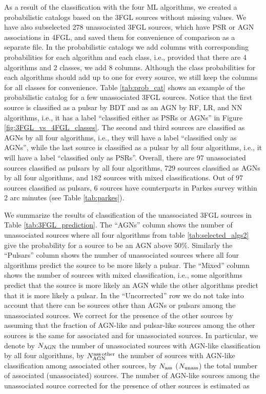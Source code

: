 As a result of the classification with the four ML algorithms,
we created a probabilistic catalogs based on the 3FGL sources without missing values.
We have also subselected 278 unassociated 3FGL sources, which have PSR or AGN associations in 4FGL,
and saved them for convenience of comparison as a separate file.
In the probabilistic catalogs we add columns with corresponding probabilities for each algorithm and each class,
i.e., provided that there are 4 algorithms and 2 classes, we add 8 columns.
Although the class probabilities for each algorithms should add up to one for every source, we still keep the columns for all classes for convenience.
Table \ref{tab:prob_cat} shows an example of the probabilistic catalog for a few unassociated 3FGL sources.
Notice that the first source is classified as a pulsar by BDT and as an AGN by RF, LR, and NN algorithms,
i.e., it has a label ``classified either as PSRs or AGNs'' in Figure \ref{fig:3FGL_vs_4FGL_classes}.
The second and third sources are classified as AGNs by all four algorithms, i.e., they will have a label
``classified only as AGNs'',
while the last source is classified as a pulsar by all four algorithms, i.e., it will have a label
``classified only as PSRs''.
Overall, there are 97 unassociated sources classified as pulsars by all four algorithms, 729 sources classified as AGNs by all four algorithms, and 182 sources with mixed classifications.
Out of 97 sources classified as pulsars, 6 sources have counterparts in Parkes survey \cite{Camilo2015} within 2 arc minutes (see Table \ref{tab:parkes}).

We summarize the results of classification of the unassociated 3FGL sources in Table \ref{tab:3FGL_prediction}.
The ``AGNs'' column shows the number of unassociated sources where all four algorithms from table \ref{tab:selected_algs2} give the probability for a source to be an AGN above 50\%.
Similarly the ``Pulsars'' column shows the number of unassociated sources where all four algorithms predict the source to be more likely a pulsar.
The ``Mixed'' column shows the number of sources with mixed classification, i.e., some algorithms predict that the source is more likely an AGN while the other algorithms predict that it is more likely a pulsar.
In the ``Uncorrected'' row we do not take into account that there can be sources other than AGNs or pulsars among the unassociated sources.
We correct for the presence of the other sources by assuming that the fraction of AGN-like and pulsar-like sources among the other sources is the same for associated and for unassociated sources.
In particular, we denote by $N_{\rm AGN}$ the number of unassociated sources with AGN-like classification by all four algorithms,
by $N_{\rm AGN}^{\rm ass\,other}$ the number of sources with AGN-like classification among associated other sources,
by $N_{\rm ass}$ ($N_{\rm unass}$) the total number of associated (unassociated) sources.
The number of AGN-like sources among the unassociated source corrected for the presence of other sources is estimated as

